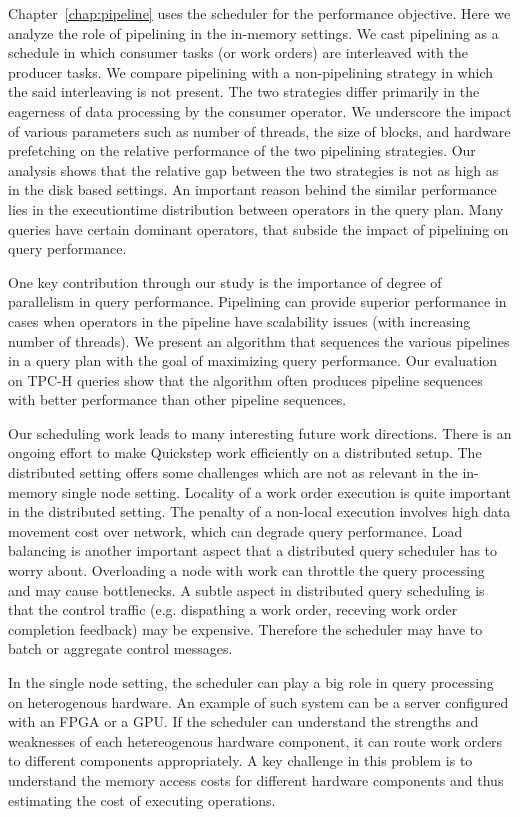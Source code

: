 Chapter~\ref{chap:pipeline} uses the scheduler for the performance objective.
Here we analyze the role of pipelining in the in-memory settings. 
We cast pipelining as a schedule in which consumer tasks (or work orders) are interleaved with the producer tasks. 
We compare pipelining with a non-pipelining strategy in which the said interleaving is not present. 
The two strategies differ primarily in the eagerness of data processing by the consumer operator. 
We underscore the impact of various parameters such as number of threads, the size of blocks, and hardware prefetching on the relative performance of the two pipelining strategies. 
Our analysis shows that the relative gap between the two strategies is not as high as in the disk based settings. 
An important reason behind the similar performance lies in the executiontime distribution between operators
in the query plan.
Many queries have certain dominant operators, that subside the impact of pipelining on query performance.

One key contribution through our study is the importance of degree of parallelism in query performance. 
Pipelining can provide superior performance in cases when operators in the pipeline have scalability issues (with increasing number of threads). 
We present an algorithm that sequences the various pipelines in a query plan with the goal of maximizing query performance.  
Our evaluation on TPC-H queries show that the algorithm often produces pipeline sequences with better performance than other pipeline sequences. 

Our scheduling work leads to many interesting future work directions.
There is an ongoing effort to make Quickstep work efficiently on a distributed setup. 
The distributed setting offers some challenges which are not as relevant in the in-memory single node setting.
Locality of a work order execution is quite important in the distributed setting.
The penalty of a non-local execution involves high data movement cost over network, which can degrade query performance.
Load balancing is another important aspect that a distributed query scheduler has to worry about.
Overloading a node with work can throttle the query processing and may cause bottlenecks.
A subtle aspect in distributed query scheduling is that the control traffic (e.g. dispathing a work order, receving work order completion feedback) may be expensive.
Therefore the scheduler may have to batch or aggregate control messages.

In the single node setting, the scheduler can play a big role in query processing on heterogenous hardware.
An example of such system can be a server configured with an FPGA or a GPU.
If the scheduler can understand the strengths and weaknesses of each hetereogenous hardware component, it can route work orders to different components appropriately. 
A key challenge in this problem is to understand the memory access costs for different hardware components and thus estimating the cost of executing operations.